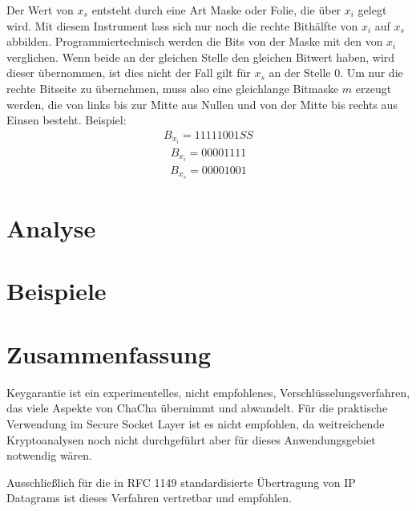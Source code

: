 \documentclass[10pt,a4paper]{article}
\begin{document}
Der Wert von $x_s$ entsteht durch eine Art Maske oder Folie, die über $x_i$ gelegt wird.
Mit diesem Instrument lass sich nur noch die rechte Bithälfte von $x_i$ auf $x_s$ abbilden.
Programmiertechnisch werden die Bits von der Maske mit den von $x_i$ verglichen.
Wenn beide an der gleichen Stelle den gleichen Bitwert haben, wird dieser übernommen, ist dies nicht der Fall gilt für $x_s$ an der Stelle 0.
Um nur die rechte Bitseite zu übernehmen, muss also eine gleichlange Bitmaske $m$ erzeugt werden, die von links bis zur Mitte aus Nullen und von der Mitte bis rechts aus Einsen besteht.
Beispiel:
\begin{align*}
    B_{x_i} = 1111 1001SS
\end{align*}
\begin{align*}
    B_{x_i} = 0000 1111
\end{align*}
\begin{align*}
    B_{x_s} = 0000 1001
\end{align*}

\section{Analyse}

\section{Beispiele}

\section{Zusammenfassung}

Keygarantie ist ein experimentelles, nicht empfohlenes, Verschlüsselungsverfahren, das viele Aspekte von ChaCha übernimmt und abwandelt.
Für die praktische Verwendung im Secure Socket Layer ist es nicht empfohlen, da weitreichende Kryptoanalysen noch nicht durchgeführt aber für dieses Anwendungsgebiet notwendig wären.

Ausschließlich für die in RFC 1149 standardisierte Übertragung von IP Datagrams\cite{Waitzman1990} ist dieses Verfahren vertretbar und empfohlen.

{}

\end{document}
